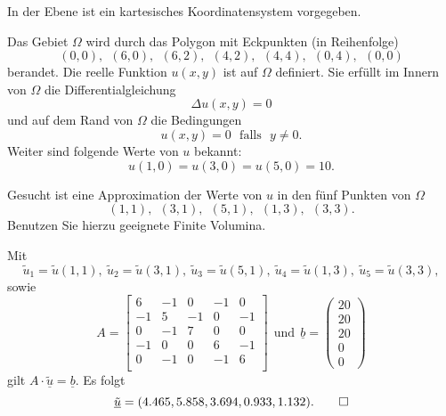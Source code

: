 In der Ebene ist ein kartesisches Koordinatensystem vorgegeben. 

Das Gebiet $\Omega$ wird durch das Polygon mit Eckpunkten (in Reihenfolge)
\[
(0,0), \ \ (6,0), \ \ (6,2), \ \ (4,2),  \ \ (4,4),  \ \ (0,4), \ \  (0,0)
\]
berandet. Die reelle Funktion $u(x,y)$ ist auf $\Omega$ definiert.
Sie erfüllt im Innern von $\Omega$ die Differentialgleichung
\[
\Delta u(x,y) = 0
\]
und auf dem Rand von $\Omega$ die Bedingungen
\[
u(x,y) = 0 \ \ \ \text{falls} \ \ \ y \neq 0.
\]
Weiter sind folgende Werte von $u$ bekannt:
\[
u(1,0) = u(3,0) = u(5,0) = 10.
\]

Gesucht ist eine Approximation der Werte von $u$ in den fünf Punkten
von $\Omega$
\[
(1,1), \ \  (3,1), \ \ (5,1), \ \  (1,3), \ \ (3,3).
\]
Benutzen Sie hierzu geeignete Finite Volumina.  

\begin{loesung}
Mit 
\[
\tilde u_1 = \tilde u(1,1), \ \tilde u_2 = \tilde u(3,1), \ \tilde u_3 = \tilde u(5,1), \ \tilde u_4 = \tilde u(1,3), \ \tilde u_5 = \tilde u(3,3), 
\]
sowie 
\[
A = \left[\begin{array}{rrrrr} 
6 & -1 & 0 & -1 & 0 \\
-1 & 5 & -1 & 0 & -1 \\
0 & -1 & 7 & 0 & 0 \\ 
-1 & 0 & 0 & 6 & -1 \\
0 & -1 & 0 & -1 & 6 \\
 \end{array}\right] \ \ \text{und} \ \
\underline{b} =  \left(\begin{array}{r} 20 \\ 20 \\ 20 \\ 0 \\ 0 \end{array}\right)
\]
gilt $A \cdot \underline{\tilde u} = \underline{b}.$ 
Es folgt 
\[
\underline{\tilde u} = (4.465, 5.858, 3.694, 0.933, 1.132).
\qedhere
\]
\end{loesung}

